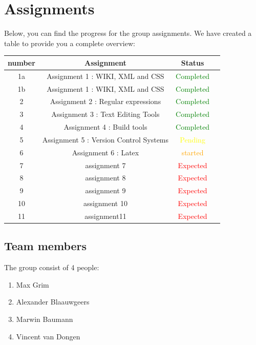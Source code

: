 \documentclass[11pt]{article}
\begin{document}
\newpage

\section{Assignments}
Below, you can find the progress for the group assignments. We have created a table to provide you a complete overview:

\begin{center}
  \begin{tabular}{| c | c | c | c |}
    \hline
    \textbf{number} & \textbf{Assignment} & \textbf{Status}  \\ \hline
    1a & Assignment 1 : WIKI, XML and CSS & \textcolor{green}{Completed}  \\ \hline
    1b & Assignment 1 : WIKI, XML and CSS & \textcolor{green}{Completed}  \\ \hline
    2 & Assignment 2 : Regular expressions & \textcolor{green}{Completed}  \\ \hline
    3 & Assignment 3 : Text Editing Tools & \textcolor{green}{Completed} \\ \hline
    4 & Assignment 4 : Build tools & \textcolor{green}{Completed} \\ \hline
    5 & Assignment 5 : Version Control Systems & \textcolor{yellow}{Pending} \\ \hline
    6 &     Assignment 6 : Latex & \textcolor{orange}{started} \\ \hline
    7 & assignment 7 & \textcolor{red}{Expected} \\ \hline
    8 & assignment 8 & \textcolor{red}{Expected}  \\ \hline
    9 & assignment 9 & \textcolor{red}{Expected}  \\ \hline
    10 & assignment 10 & \textcolor{red}{Expected}  \\ \hline
    11 & assignment11 & \textcolor{red}{Expected}  \\
    \hline
  \end{tabular}
\end{center}

\subsection{Team members}
The group consist of 4 people:
\begin{enumerate}
  \item Max Grim
  \item Alexander Blaauwgeers
  \item Marwin Baumann
  \item Vincent van Dongen 
\end{enumerate}
\end{document}
